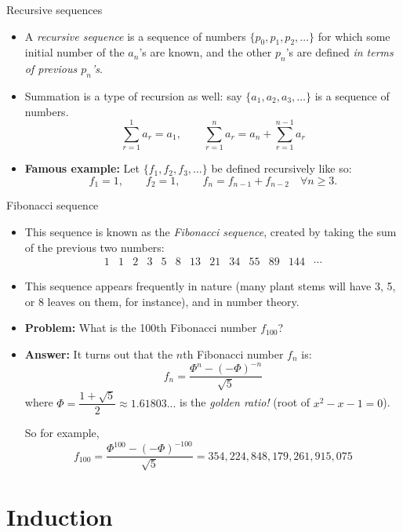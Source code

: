 \documentclass[11pt,aspectratio=1610,handout]{beamer}
\begin{document}
\begin{frame}{Recursive sequences}
	\begin{itemize}
		\item A \emph{recursive sequence} is a sequence of numbers $\{p_0, p_1, p_2, \ldots\}$ for which some initial number of the $a_n$'s are known, and the other $p_n$'s are defined \emph{in terms of previous $p_n$'s}. \p 
		\item Summation is a type of recursion as well: say $\{a_1, a_2, a_3, \ldots\}$ is a sequence of numbers. \p
		\[
		\sum_{r=1}^1 a_r = a_1, \qquad \sum_{r=1}^n a_r = a_{n} + \sum_{r=1}^{n-1} a_r
		\] \p
		\item \textbf{Famous example:} Let $\{f_1, f_2, f_3, \ldots\}$ be defined recursively like so: 
		\[
		f_1 = 1, \qquad f_2 = 1, \qquad f_n = f_{n-1} + f_{n-2}  \quad \forall n \geq 3. 
		\]
	\end{itemize}
\end{frame}

\begin{frame}{Fibonacci sequence}
	\begin{itemize}
		\item This sequence is known as the \emph{Fibonacci sequence}, created by taking the sum of the previous two numbers:
		\[
		\begin{array}{ccccccccccccc}
		1 & 1 & 2 & 3 & 5 & 8 & 13 & 21 & 34 & 55 & 89 & 144 & \cdots
		\end{array}
		\]\p 
		\item This sequence appears frequently in nature (many plant stems will have 3, 5, or 8 leaves on them, for instance), and in number theory. \p
		\item \textbf{Problem:} What is the 100th Fibonacci number $f_{100}$? \p
		\item \textbf{Answer:} It turns out that the $n$th Fibonacci number $f_n$ is: \p
		\[
		f_n = \frac{\Phi^n - (-\Phi)^{-n}}{\sqrt 5}
		\] \p
		where $\Phi = \dfrac{1 + \sqrt 5}{2} \approx 1.61803...$ is the \emph{golden ratio!} \p (root of $x^2-x-1=0$). \p 
		
		So for example, 
		\[
		f_{100} = \frac{\Phi^{100} - (-\Phi)^{-100}}{\sqrt 5} = 354,224,848,179,261,915,075
		\]
	\end{itemize}
\end{frame}

\section{Induction}
\end{document}
